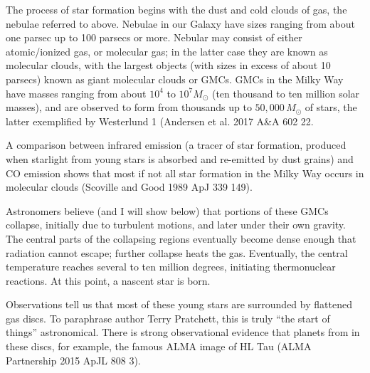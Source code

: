 \documentclass[../dissertation.tex]{subfiles}
\begin{document}
The process of star formation begins with the dust and cold clouds of gas, the nebulae referred to above. 
Nebulae in our Galaxy have sizes ranging from about one parsec up to 100 parsecs or more. 
Nebular may consist of either atomic/ionized gas, or molecular gas; 
in the latter case they are known as molecular clouds, with the largest objects (with sizes in excess of about 10 parsecs) known as giant molecular clouds or GMCs. 
GMCs in the Milky Way have masses ranging from about $10^4$ to $10^7M_\odot$ (ten thousand to ten million solar masses), 
and are observed to form from thousands up to $50,000\,M_\odot$ of stars, the latter exemplified by Westerlund 1 (Andersen et al. 2017 A\&A 602 22.

A comparison between infrared emission (a tracer of star formation, produced when starlight from young stars is absorbed and re-emitted by dust grains) and CO emission shows that most if not all star formation in the Milky Way occurs in molecular clouds (Scoville and Good 1989 ApJ 339 149).

Astronomers believe (and I will show below) that portions of these GMCs collapse, initially due to turbulent motions, and later under their own gravity. 
The central parts of the collapsing regions eventually become dense enough that radiation cannot escape; further collapse heats the gas. 
Eventually, the central temperature reaches several to ten million degrees, initiating  thermonuclear reactions. At this point, a nascent star is born.

Observations tell us that most of these young stars are surrounded by flattened gas discs. To paraphrase author Terry Pratchett, this is truly ``the start of things'' astronomical. 
There is strong observational evidence that planets from in these discs, for example, the famous ALMA image of HL Tau (ALMA Partnership 2015 ApJL 808 3).

\end{document}
